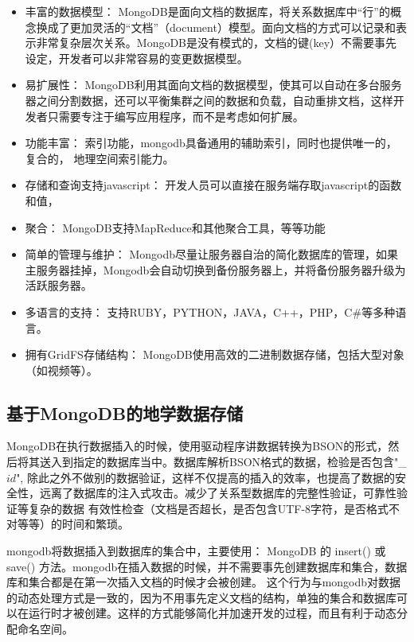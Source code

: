 \documentclass[master]{njnuthesis}
\begin{document}
\begin{itemize}
\item 丰富的数据模型：
MongoDB是面向文档的数据库，将关系数据库中“行”的概念换成了更加灵活的“文档”（document）模型。面向文档的方式可以记录和表示非常复杂层次关系。MongoDB是没有模式的，文档的键(key）不需要事先设定，开发者可以非常容易的变更数据模型。
\item 易扩展性：
MongoDB利用其面向文档的数据模型，使其可以自动在多台服务器之间分割数据，还可以平衡集群之间的数据和负载，自动重排文档，这样开发者只需要专注于编写应用程序，而不是考虑如何扩展。
\item 功能丰富：
索引功能，mongodb具备通用的辅助索引，同时也提供唯一的，复合的， 地理空间索引能力。
\item 存储和查询支持javascript：
开发人员可以直接在服务端存取javascript的函数和值，
\item 聚合：
MongoDB支持MapReduce和其他聚合工具，等等功能
\item 简单的管理与维护：
Mongodb尽量让服务器自治的简化数据库的管理，如果主服务器挂掉，Mongodb会自动切换到备份服务器上，并将备份服务器升级为活跃服务器。
\item 多语言的支持：
支持RUBY，PYTHON，JAVA，C++，PHP，C\#等多种语言。
\item 拥有GridFS存储结构：
MongoDB使用高效的二进制数据存储，包括大型对象（如视频等）。
\end{itemize}

\subsection{基于MongoDB的地学数据存储}
 MongoDB在执行数据插入的时候，使用驱动程序讲数据转换为BSON的形式，然后将其送入到指定的数据库当中。数据库解析BSON格式的数据，检验是否包含"\_$id$",
除此之外不做别的数据验证，这样不仅提高的插入的效率，也提高了数据的安全性，远离了数据库的注入式攻击。减少了关系型数据库的完整性验证，可靠性验证等复杂的数据 有效性检查（文档是否超长，是否包含UTF-8字符，是否格式不对等等）的时间和繁琐。

    mongodb将数据插入到数据库的集合中，主要使用： MongoDB 的  insert() 或 save() 方法。mongodb在插入数据的时候，并不需要事先创建数据库和集合，数据库和集合都是在第一次插入文档的时候才会被创建。
这个行为与mongodb对数据的动态处理方式是一致的，因为不用事先定义文档的结构，单独的集合和数据库可以在运行时才被创建。这样的方式能够简化并加速开发的过程，而且有利于动态分配命名空间。
\end{document}

